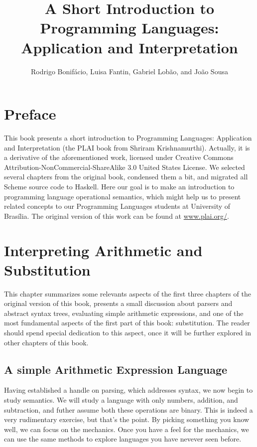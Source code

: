 \documentclass{book}
\title{A Short Introduction to Programming 
Languages: Application and Interpretation}
\author{Rodrigo Bonif\'{a}cio, Luisa Fantin, Gabriel Lob\~{a}o, and Jo\~{a}o Sousa}
\begin{document}
\maketitle


\chapter*{Preface} 

This book presents a short introduction to 
Programming Languages: Application and 
Interpretation (the PLAI book from Shriram Krishnamurthi). 
Actually, it is a derivative of the aforementioned 
work, licensed under Creative Commons 
Attribution-NonCommercial-ShareAlike 3.0 
United States License. We selected several chapters 
from the original book, condensed them a bit, and 
migrated all Scheme source code to Haskell. 
Here our goal is to make an introduction to 
programming language operational 
semantics, which might help us to present 
related concepts to our Programming Languages 
students at University of 
Bras\'{i}lia. The original version of this work 
can be found at \url{www.plai.org/}. 

 

\doclicenseThis
\chapter{Interpreting Arithmetic and Substitution}

This chapter summarizes some relevants 
aspects of the first three chapters of the 
original version of this book, presents a 
small discussion about parsers and abstract syntax 
trees, evaluating simple arithmetic expressions, 
and one of the most fundamental aspects of the 
first part of this book: substitution. The reader 
should spend special dedication to this aspect, 
once it will be further explored in other chapters of this 
book. 

\section{A simple Arithmetic Expression Language} 

Having established a handle on parsing, 
which addresses syntax, we now begin to 
study semantics. We will study a language 
with only numbers, addition, and subtraction, 
and futher assume both these operations 
are binary. This is indeed a very rudimentary 
exercise, but that's the point. By picking 
something you know well, we can 
focus on the mechanics. Once you have a feel for the 
mechanics, we can use the same methods 
to explore languages you have nevever seen before. 
\end{document}
